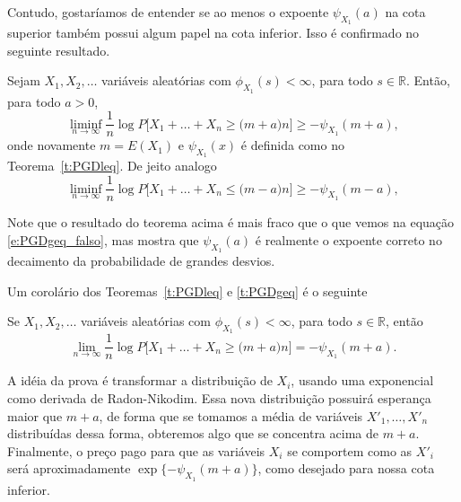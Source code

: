 Contudo, gostaríamos de entender se ao menos o expoente $\psi_{X_1}(a)$ na cota superior também possui algum papel na cota inferior.
Isso é confirmado no seguinte resultado.

\begin{theorem}
  \label{t:PGDgeq}
  Sejam $X_1, X_2, \dots$ variáveis aleatórias \iid com $\phi_{X_1}(s) < \infty$, para todo $s \in \mathbb{R}$.
  Então, para todo $a > 0$,
  \begin{equation}
    \liminf_{n \to \infty} \frac{1}{n} \log P\big[ X_1 + \dots + X_n \geq \big(m + a \big) n \big] \geq -\psi_{X_1}(m + a),
  \end{equation}
  onde novamente $m = E(X_1)$ e $\psi_{X_1}(x)$ é definida como no Teorema~\ref{t:PGDleq}.
  De jeito analogo
    \begin{equation}
    \liminf_{n \to \infty} \frac{1}{n} \log P\big[ X_1 + \dots + X_n \leq \big(m - a \big) n \big] \geq -\psi_{X_1}(m - a),
  \end{equation}
\end{theorem}

Note que o resultado do teorema acima é mais fraco que o que vemos na equação \eqref{e:PGDgeq_falso}, mas mostra que $\psi_{X_1}(a)$ é realmente o expoente correto no decaimento da probabilidade de grandes desvios.

Um corolário dos Teoremas~\ref{t:PGDleq} e \ref{t:PGDgeq} é o seguinte

\begin{corollary}
  Se $X_1, X_2, \dots$ variáveis aleatórias \iid com $\phi_{X_1}(s) < \infty$, para todo $s \in \mathbb{R}$, então
  \begin{equation}
    \lim_{n \to \infty} \frac{1}{n} \log P\big[ X_1 + \dots + X_n \geq \big(m + a \big) n \big] = -\psi_{X_1}(m + a).
  \end{equation}
\end{corollary}

A idéia da prova é transformar a distribuição de $X_i$, usando uma exponencial como derivada de Radon-Nikodim.
Essa nova distribuição possuirá esperança maior que $m + a$, de forma que se tomamos a média de variáveis \iid $X'_1, \dots, X'_n$ distribuídas dessa forma, obteremos algo que se concentra acima de $m + a$.
Finalmente, o preço pago para que as variáveis $X_i$ se comportem como as $X'_i$ será aproximadamente $\exp\{-\psi_{X_1}(m + a)\}$, como desejado para nossa cota inferior.

